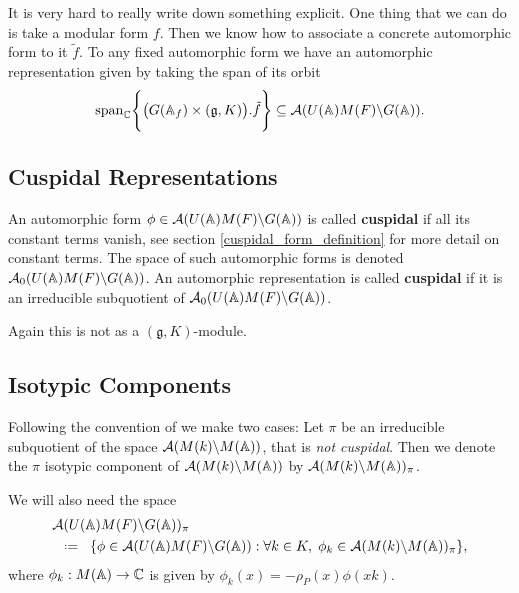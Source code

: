 \begin{example}
    It is very hard to really write down something explicit. One thing that we can do is take a modular form \(f\). Then we know how to associate a concrete automorphic form to it \(\tilde{f}\). To any fixed automorphic form we have an automorphic representation given by taking the span of its orbit
    \[\mathrm{span}_\C \Biggl\{\big(G(\A_f)\times (\mathfrak{g}, K)\big).\tilde{f}\Biggr\} \subseteq \mathcal{A}(U(\A)M(F)\backslash G(\A)).\]
\end{example}

\subsection{Cuspidal Representations}
An automorphic form \(\phi\in \mathcal{A}(U(\A)M(F) \backslash G(\A))\) is called \textbf{cuspidal}  if all its constant terms vanish, see section \ref{cuspidal_form_definition} for more detail on constant terms.
The space of such automorphic forms is denoted \(\mathcal{A}_0(U(\A)M(F) \backslash G(\A))\). An automorphic representation is called \textbf{cuspidal} if it is an irreducible subquotient of \(\mathcal{A}_0(U(\A)M(F) \backslash G(\A))\).

\begin{remark}
    Again this is not as a \((\mathfrak{g}, K)\)-module.
\end{remark}

\subsection{Isotypic Components}\label{automorphic_isotypic_subspaces}
Following the convention of \cite[II.1]{moeglinSpectralDecompositionEisenstein1995} we make two cases:
Let \(\pi\) be an irreducible subquotient of the space \(\mathcal{A}(M(k) \backslash M(\A))\), that is \textit{not cuspidal}. Then we denote the \(\pi\) isotypic component of \(\mathcal{A}(M(k) \backslash M(\A))\) by \(\mathcal{A}(M(k) \backslash M(\A))_\pi\).

We will also need the space 
\begin{align*}
	&\mathcal{A}(U(\A)M(F) \backslash G(\A))_\pi \\ &\defeq \{\phi \in \mathcal{A}(U(\A)M(F) \backslash G(\A)) : \forall k\in K, \; \phi_k\in\mathcal{A}(M(k) \backslash M(\A))_\pi \},
\end{align*}
where \(\phi_k: M(\A) \to \C\) is given by \(\phi_k(x) = -\rho_P(x)\phi(xk)\).

